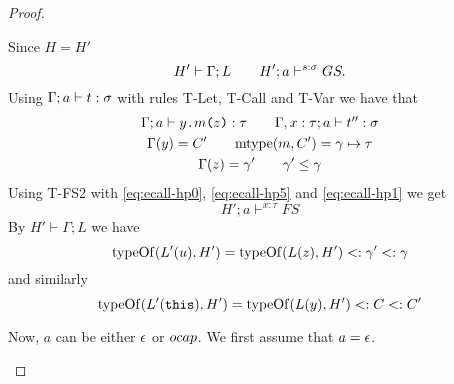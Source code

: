 \begin{proof}
\begin{description}
\begin{description}
\begin{equation}
          \end{equation}
          Since $H = H'$
          \begin{equation} \label{eq:ecall-hp5}
            H' \vdash \Gamma;L \quad\quad H'; a \vdash^{s: \sigma} GS.
          \end{equation}
          Using $\mbox{$\Gamma;a\vdash t:\sigma$}$ with rules {\sc T-Let, T-Call} and
          {\sc T-Var} we have that
          \begin{equation} \label{eq:ecall-hp1}
            \begin{gathered}
              \mbox{$\Gamma;a\vdash\mbox{$y$\texttt{.}$m$\texttt{(}$z$\texttt{)}}:\tau$} \quad\quad \mbox{$\Gamma,
              x: \tau;a\vdash t'':\sigma$} \\
              \Gamma(y) = C' \quad\quad \mbox{$\mathrm{mtype}$}(m, C') = \gamma \mapsto \tau \\
              \Gamma(z) = \gamma' \quad\quad \gamma' \leq \gamma
            \end{gathered}
          \end{equation}
          Using {\sc T-FS2} with \eqref{eq:ecall-hp0}, \eqref{eq:ecall-hp5} and
          \eqref{eq:ecall-hp1} we get 
          \begin{equation} \label{eq:ecall-hp6}
            H';a \vdash^{x: \tau} FS
          \end{equation}
          By $H' \vdash \Gamma;L$ we have
          \begin{equation} \label{eq:ecall-hp2}
            \mbox{$\mathrm{typeOf}$}(L'(u), H') = \mbox{$\mathrm{typeOf}$}(L(z), H') <: \gamma' <: \gamma
          \end{equation}
          and similarly
          \begin{equation} \label{eq:ecall-hp3}
            \mbox{$\mathrm{typeOf}$}(L'(\mbox{\texttt{this}}), H') = \mbox{$\mathrm{typeOf}$}(L(y), H') <: C <: C'
          \end{equation}

          Now, $a$ can be either $\mbox{$\epsilon$}$ or $\mbox{$ocap$}$. We first assume that $a =
          \mbox{$\epsilon$}$.


\end{description}
\end{description}
\end{proof}
